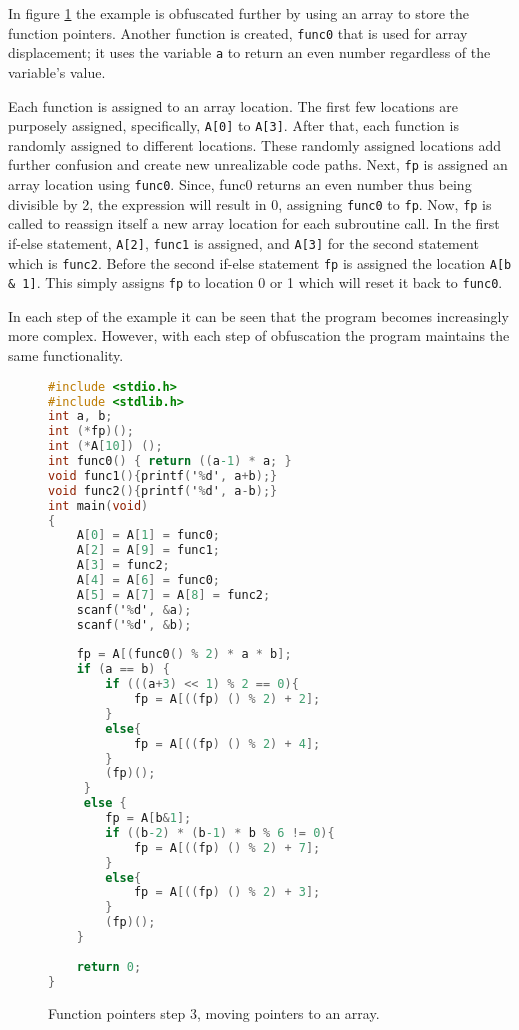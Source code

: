 \documentclass[conference]{IEEEtran}
\begin{document}
In figure \ref{fig:func-pointer-3} the example is obfuscated further by using an array to store the function pointers. Another function is created, \texttt{func0} that is used for array displacement; it uses the variable \texttt{a} to return an even number regardless of the variable's value. 

Each function is assigned to an array location. The first few locations are purposely assigned, specifically, \texttt{A[0]} to \texttt{A[3]}. After that, each function is randomly assigned to different locations. These randomly assigned locations add further confusion and create new unrealizable code paths. Next, \texttt{fp} is assigned an array location using \texttt{func0}. Since, func0 returns an even number thus being divisible by 2, the expression will result in 0, assigning \texttt{func0} to \texttt{fp}. Now, \texttt{fp} is called to reassign itself a new array location for each subroutine call. In the first if-else statement, \texttt{A[2]}, \texttt{func1} is assigned, and \texttt{A[3]} for the second statement which is \texttt{func2}. Before the second if-else statement \texttt{fp} is assigned the location \texttt{A[b \& 1]}. This simply assigns \texttt{fp} to location 0 or 1 which will reset it back to \texttt{func0}. 

In each step of the example it can be seen that the program becomes increasingly more complex. However, with each step of obfuscation the program maintains the same functionality.
 
\begin{figure}[h]
\begin{lstlisting}[language=C,basicstyle=\footnotesize]
#include <stdio.h>
#include <stdlib.h> 
int a, b;
int (*fp)();
int (*A[10]) ();
int func0() { return ((a-1) * a; }
void func1(){printf('%d', a+b);}
void func2(){printf('%d', a-b);}
int main(void)
{
    A[0] = A[1] = func0;
	A[2] = A[9] = func1;
	A[3] = func2;
	A[4] = A[6] = func0;
	A[5] = A[7] = A[8] = func2;
	scanf('%d', &a);
	scanf('%d', &b);
	
	fp = A[(func0() % 2) * a * b];
	if (a == b) {
	    if (((a+3) << 1) % 2 == 0){
	        fp = A[((fp) () % 2) + 2];
	    }
	    else{
	        fp = A[((fp) () % 2) + 4];
	    }
	    (fp)();
	 } 
	 else { 
	    fp = A[b&1];
	    if ((b-2) * (b-1) * b % 6 != 0){
	        fp = A[((fp) () % 2) + 7];
	    }
	    else{
	        fp = A[((fp) () % 2) + 3];
	    }
	    (fp)();
	}
	
	return 0;
}
\end{lstlisting}
\caption{Function pointers step 3, moving pointers to an array.}
\label{fig:func-pointer-3}
\end{figure}
\end{document}

